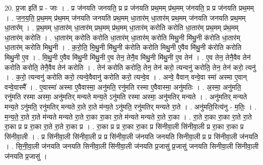 \documentclass[17pt]{extarticle}
\begin{document}
20. प्र॒जा इति॑ प्र - जाः । . प्र ज॑नयति जनयति॒ प्र प्र ज॑नयति प्रथ॒मम् प्र॑थ॒मम् ज॑नयति॒ प्र प्र ज॑नयति प्रथ॒मम् । . ज॒न॒य॒ति॒ प्र॒थ॒मम् प्र॑थ॒मम् ज॑नयति जनयति प्रथ॒मम् धा॒तार॑म् धा॒तार॑म् प्रथ॒मम् ज॑नयति जनयति प्रथ॒मम् धा॒तार᳚म् । . प्र॒थ॒मम् धा॒तार॑म् धा॒तार॑म् प्रथ॒मम् प्र॑थ॒मम् धा॒तार॑म् करोति करोति धा॒तार॑म् प्रथ॒मम् प्र॑थ॒मम् धा॒तार॑म् करोति । . धा॒तार॑म् करोति करोति धा॒तार॑म् धा॒तार॑म् करोति मिथु॒नी मि॑थु॒नी क॑रोति धा॒तार॑म् धा॒तार॑म् करोति मिथु॒नी । . क॒रो॒ति॒ मि॒थु॒नी मि॑थु॒नी क॑रोति करोति मिथु॒नी ए॒वैव मि॑थु॒नी क॑रोति करोति मिथु॒नी ए॒व । . मि॒थु॒नी ए॒वैव मि॑थु॒नी मि॑थु॒नी ए॒व तेन॒ तेनै॒व मि॑थु॒नी मि॑थु॒नी ए॒व तेन॑ । . ए॒व तेन॒ तेनै॒वैव तेन॑ करोति करोति॒ तेनै॒वैव तेन॑ करोति । . तेन॑ करोति करोति॒ तेन॒ तेन॑ करो॒ त्यन्वनु॑ करोति॒ तेन॒ तेन॑ करो॒ त्यनु॑ । . क॒रो॒ त्यन्वनु॑ करोति करो॒ त्यन्वे॒वैवानु॑ करोति करो॒ त्यन्वे॒व । . अन्वे॒ वैवान् वन्वे॒वा स्मा॑ अस्मा ए॒वान् वन्वे॒वास्मै᳚ । . ए॒वास्मा॑ अस्मा ए॒वैवास्मा॒ अनु॑मति॒ रनु॑मति रस्मा ए॒वैवास्मा॒ अनु॑मतिः । . अ॒स्मा॒ अनु॑मति॒ रनु॑मति रस्मा अस्मा॒ अनु॑मतिर् मन्यते मन्य॒ते ऽनु॑मति रस्मा अस्मा॒ अनु॑मतिर् मन्यते । . अनु॑मतिर् मन्यते मन्य॒ते ऽनु॑मति॒ रनु॑मतिर् मन्यते रा॒ते रा॒ते म॑न्य॒ते ऽनु॑मति॒ रनु॑मतिर् मन्यते रा॒ते । . अनु॑मति॒रित्य॑नु - म॒तिः॒ । . म॒न्य॒ते॒ रा॒ते रा॒ते म॑न्यते मन्यते रा॒ते रा॒का रा॒का रा॒ते म॑न्यते मन्यते रा॒ते रा॒का । . रा॒ते रा॒का रा॒का रा॒ते रा॒ते रा॒का प्र प्र रा॒का रा॒ते रा॒ते रा॒का प्र । . रा॒का प्र प्र रा॒का रा॒का प्र सि॑नीवा॒ली सि॑नीवा॒ली प्र रा॒का रा॒का प्र सि॑नीवा॒ली । . प्र सि॑नीवा॒ली सि॑नीवा॒ली प्र प्र सि॑नीवा॒ली ज॑नयति जनयति सिनीवा॒ली प्र प्र सि॑नीवा॒ली ज॑नयति । . सि॒नी॒वा॒ली ज॑नयति जनयति सिनीवा॒ली सि॑नीवा॒ली ज॑नयति प्र॒जासु॑ प्र॒जासु॑ जनयति सिनीवा॒ली सि॑नीवा॒ली ज॑नयति प्र॒जासु॑ । \newline
\end{document}
